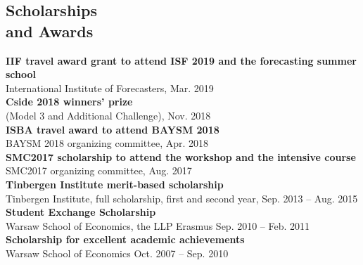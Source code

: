 \documentclass[margin,line]{resume}
\begin{document}
\begin{resume}


 


   \section{\mysidestyle Scholarships \\and Awards}	
   	\textbf{IIF travel award grant to attend ISF 2019 and the forecasting summer school} \\
   	International Institute of Forecasters,%
   	\hfill Mar. 2019 \vspace{1.5mm} \\ 
   	\textbf{Cside 2018 winners' prize} \\
   	(Model 3 and Additional Challenge),%
   	 \hfill Nov. 2018 \vspace{1.5mm} \\ 
   	\textbf{ISBA travel award to attend BAYSM 2018}\\ BAYSM 2018 organizing committee,%
   	\hfill Apr. 2018 \vspace{1.5mm} \\ 
   	\textbf{SMC2017 scholarship to attend the workshop and the intensive course}\\ SMC2017 organizing committee, %
   	\hfill Aug. 2017 \vspace{1.5mm} \\   
   	\textbf{Tinbergen Institute merit-based scholarship}\\ Tinbergen Institute, full scholarship, first and second year,%
   	\hfill Sep. 2013 -- Aug. 2015\vspace{1.5mm} \\   
       \textbf{Student Exchange Scholarship}\\  Warsaw School of Economics, the LLP Erasmus \hfill Sep. 2010 -- Feb. 2011\vspace{1.5mm} \\
       \textbf{Scholarship for excellent academic achievements}\\ Warsaw School of Economics \hfill Oct. 2007 -- Sep. 2010 


\end{resume}
\end{document}
